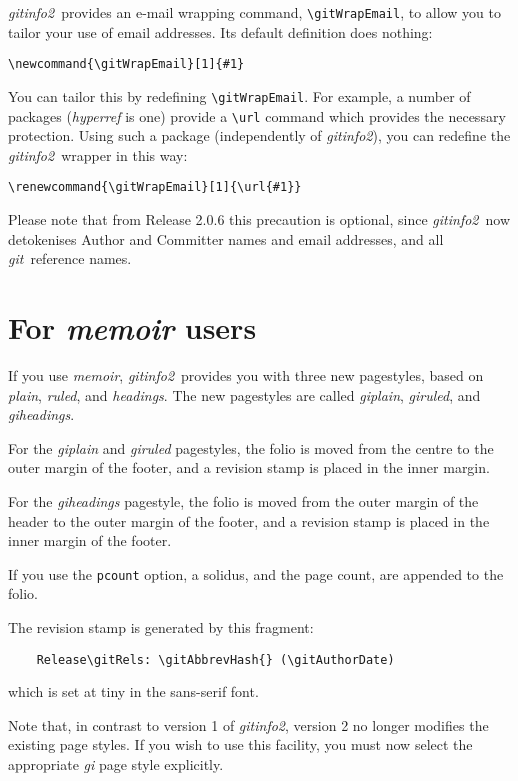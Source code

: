 \documentclass[a4paper,12pt,twoside,openany]{memoir}
\newcommand{\sfit}[1]{\textit{#1}}
\newcommand{\git}{\sfit{git}}
\newcommand{\tpname}{\sfit{gitinfo2}}
\begin{document}
\tpname\ provides an e-mail wrapping command,
\verb!\gitWrapEmail!, to allow you to tailor your use
of email addresses. Its default definition does nothing:
\begin{verbatim}
\newcommand{\gitWrapEmail}[1]{#1}
\end{verbatim}
You can tailor this by redefining \verb!\gitWrapEmail!.
For example, a number of packages
(\sfit{hyperref} is one) provide a \verb!\url! command
which provides the necessary protection.
Using such a package (independently of \tpname),
you can redefine the \tpname\ wrapper in this way:
\begin{verbatim}
\renewcommand{\gitWrapEmail}[1]{\url{#1}}
\end{verbatim}

Please note that from Release 2.0.6 this precaution is optional,
since \tpname\ now detokenises Author and Committer names and email addresses,
and all \git\ reference names.

\section{For \sfit{memoir} users}
\label{sect:memuser}
If you use \sfit{memoir}, \tpname\ provides you with
three new pagestyles, based on
\sfit{plain}, \sfit{ruled}, and \sfit{headings}.
The new pagestyles are called
\sfit{giplain}, \sfit{giruled}, and \sfit{giheadings}.

For the \sfit{giplain} and \sfit{giruled} pagestyles,
the folio is moved from the centre to the outer margin of the footer,
and a revision stamp is placed in the inner margin.

For the \sfit{giheadings} pagestyle,
the folio is moved from the outer margin of the header
to the outer margin of the footer,
and a revision stamp is placed in the inner margin of the footer.

If you use the \texttt{pcount} option, a solidus, and the page count,
are appended to the folio.

The revision stamp is generated by this fragment:

\begin{verbatim}
    Release\gitRels: \gitAbbrevHash{} (\gitAuthorDate)
\end{verbatim}
\noindent
which is set at tiny in the sans-serif font.

Note that, in contrast to version 1 of \tpname,
version 2 no longer modifies the existing page styles.
If you wish to use this facility,
you must now select
the appropriate \sfit{gi\textellipsis} page style
explicitly.
\end{document}
